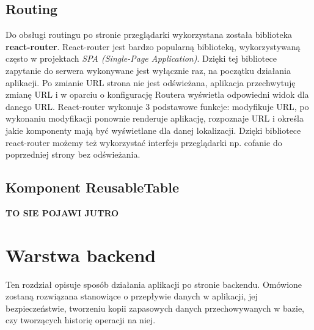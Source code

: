 \documentclass[11pt]{article}
\begin{document}
\subsection{Routing}
Do obsługi routingu po stronie przeglądarki wykorzystana została biblioteka \textbf{react-router}. React-router jest bardzo popularną biblioteką, wykorzystywaną często w projektach \emph{SPA (Single-Page Application)}. Dzięki tej bibliotece zapytanie do serwera wykonywane jest wyłącznie raz, na początku działania aplikacji. Po zmianie URL strona nie jest odświeżana, aplikacja przechwytuję zmianę URL i w oparciu o konfigurację Routera wyświetla odpowiedni widok dla danego URL. React-router wykonuje 3 podstawowe funkcje: modyfikuje URL, po wykonaniu modyfikacji ponownie renderuje aplikację, rozpoznaje URL i określa jakie komponenty mają być wyświetlane dla danej lokalizacji. Dzięki bibliotece react-router możemy też wykorzystać interfejs przeglądarki np. cofanie do poprzedniej strony bez odświeżania. 

\subsection{Komponent ReusableTable}
\textbf{TO SIE POJAWI JUTRO}



\section{Warstwa backend}
Ten rozdział opisuje sposób działania aplikacji po stronie backendu. Omówione zostaną rozwiązana stanowiące o przepływie danych w aplikacji, jej bezpieczeństwie, tworzeniu kopii zapasowych danych przechowywanych w bazie, czy tworzących historię operacji na niej.
\end{document}
